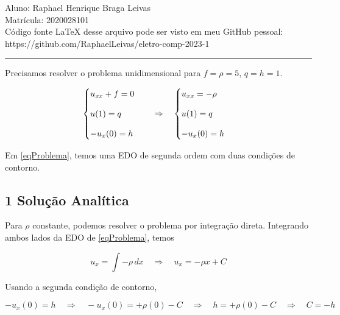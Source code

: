 \documentclass[12pt]{scrartcl}
\newcommand{\logo}{\quad \Rightarrow \quad}
\begin{document}
\pagestyle{fancy}

\fancyhead{}
\fancyfoot{}

\begin{center}
    Aluno: Raphael Henrique Braga Leivas \\
    Matrícula: 2020028101 \\[20pt]
    Código fonte LaTeX desse arquivo pode ser visto em meu GitHub pessoal: \\
    https://github.com/RaphaelLeivas/eletro-comp-2023-1
\end{center}

\hrule
\vspace{1cm}

Precisamos resolver o problema unidimensional para $f = \rho = 5$, $q = h = 1$.

\begin{equation}\label{eqProblema}
    \begin{cases}
        u_{xx} + f = 0 \\
        \noalign{\vskip9pt}
        u(1) = q       \\
        \noalign{\vskip9pt}
        -u_x(0) = h
    \end{cases}
    \logo
    \begin{cases}
        u_{xx} = - \rho \\
        \noalign{\vskip9pt}
        u(1) = q        \\
        \noalign{\vskip9pt}
        -u_x(0) = h
    \end{cases}
\end{equation}

Em \eqref{eqProblema}, temos uma EDO de segunda ordem com duas
condições de contorno.

\subsection*{1 Solução Analítica}

Para $\rho$ constante, podemos resolver o problema por integração direta.
Integrando ambos lados da EDO de \eqref{eqProblema}, temos

\[
    u_x = \int -\rho \, dx
    \logo
    u_x = - \rho x + C
\]

Usando a segunda condição de contorno,

\[
    -u_x(0) = h
    \logo
    -u_x(0) = + \rho (0) - C
    \logo
    h = + \rho (0) - C
    \logo
    C = - h
\]
\end{document}
